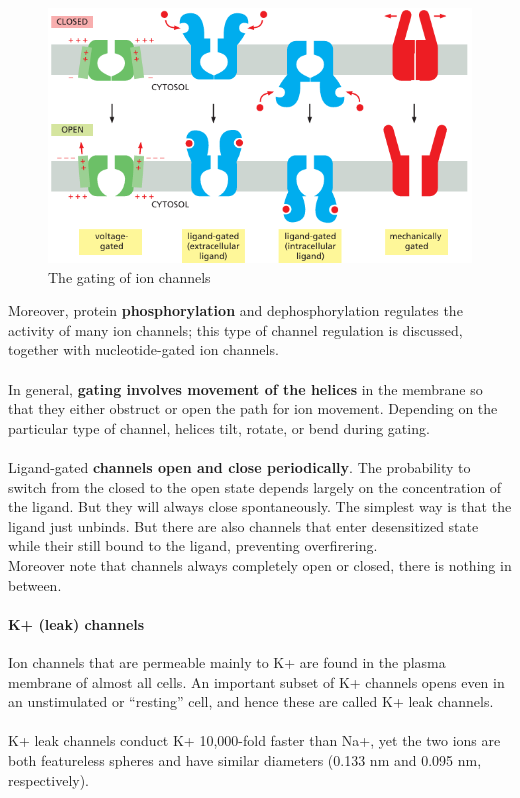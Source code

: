 \documentclass[../main.tex]{subfiles}
\begin{document}
\begin{figure}[H]
	\centering
	\includegraphics[width = 0.7 \textwidth]{20}
	\caption{The gating of ion channels}
	\label{gatingchannels}
\end{figure}
Moreover, protein \textbf{phosphorylation} and dephosphorylation regulates the activity of many ion channels; this type of channel regulation is discussed, together with nucleotide-gated ion channels. \\
\\
In general, \textbf{gating involves movement of the helices} in the membrane so that they either obstruct or open the path for ion movement. Depending on the particular type of channel, helices tilt, rotate, or bend during gating. \\
\\
Ligand-gated \textbf{channels open and close periodically}. The probability to switch from the closed to the open state depends largely on the concentration of the ligand. But they will always close spontaneously. The simplest way is that the ligand just unbinds. But there are also channels that enter desensitized state while their still bound to the ligand, preventing overfirering.\\
Moreover note that channels always completely open or closed, there is nothing in between. 


\paragraph{K+ (leak) channels}
Ion channels that are permeable mainly to K+ are found in the plasma membrane of almost all cells. An important subset of K+ channels opens even in an unstimulated or “resting” cell, and hence these are called K+ leak channels.\\
\\
K+ leak channels conduct K+ 10,000-fold faster than Na+, yet the two ions are both featureless spheres and have similar diameters (0.133 nm and 0.095 nm, respectively).
\end{document}
